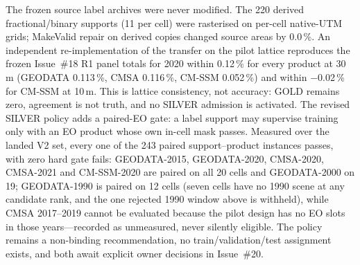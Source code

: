 The frozen source label archives were never modified. The 220 derived
fractional/binary supports (11 per cell) were rasterised on per-cell
native-UTM grids; MakeValid repair on derived copies changed source
areas by 0.0\,\%. An independent re-implementation of the transfer on
the pilot lattice reproduces the frozen Issue~\#18 R1 panel totals for
2020 within 0.12\,\% for every product at 30\,m (GEODATA 0.113\,\%,
CMSA 0.116\,\%, CM-SSM 0.052\,\%) and within $-$0.02\,\% for CM-SSM at
10\,m. This is lattice consistency, not accuracy: GOLD remains zero,
agreement is not truth, and no SILVER admission is activated. The
revised SILVER policy adds a paired-EO gate: a label support may
supervise training only with an EO product whose own in-cell mask
passes. Measured over the landed V2 set, every one of the 243
paired support--product instances passes, with zero hard gate fails:
GEODATA-2015, GEODATA-2020, CMSA-2020, CMSA-2021 and CM-SSM-2020 are
paired on all 20 cells and GEODATA-2000 on 19; GEODATA-1990 is paired
on 12 cells (seven cells have no 1990 scene at any candidate rank, and
the one rejected 1990 window above is withheld), while CMSA 2017--2019
cannot be evaluated because the pilot design has no EO slots in those
years---recorded as unmeasured, never silently eligible. The policy
remains a non-binding recommendation, no train/validation/test
assignment exists, and both await explicit owner decisions in
Issue~\#20.


